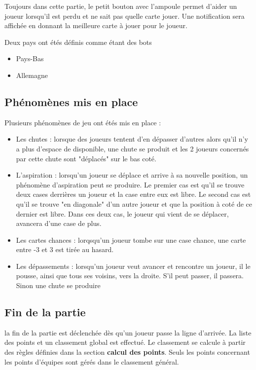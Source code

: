\documentclass[a4paper, 11pt]{article}
\begin{document}
Toujours dans cette partie, le petit bouton avec l'ampoule permet d'aider un joueur lorsqu'il est perdu et ne sait pas quelle carte jouer.
Une notification sera affichée en donnant la meilleure carte à jouer pour le joueur.
\bigskip

Deux pays ont étés définis comme étant des bots
\begin{itemize}
	\item Pays-Bas
	\item Allemagne
\end{itemize}

\subsection{Phénomènes mis en place}
Plusieurs phénomènes de jeu ont étés mis en place :
\begin{itemize}
	\item Les chutes : lorsque des joueurs tentent d'en dépasser d'autres alors qu'il n'y a plus d'espace de disponible, une chute se produit et les 2 joueurs concernés par cette chute sont "déplacés" sur le bas coté.
	\item L'aspiration : lorsqu'un joueur se déplace et arrive à sa nouvelle position, un phénomène d'aspiration peut se produire. Le premier cas est qu'il se trouve deux cases derrières un joueur et la case entre eux est libre. Le second cas est qu'il se trouve "en diagonale" d'un autre joueur et que la position à coté de ce dernier est libre. Dans ces deux cas, le joueur qui vient de se déplacer, avancera d'une case de plus.
	\item Les cartes chances : lorqsqu'un joueur tombe sur une case chance, une carte entre -3 et 3 est tirée au hasard.
	\item Les dépassements : lorsqu'un joueur veut avancer et rencontre un joueur, il le pousse, ainsi que tous ses voisins, vers la droite. S'il peut passer, il passera. Sinon une chute se produire
\end{itemize}

\subsection{Fin de la partie}
la fin de la partie est déclenchée dès qu'un joueur passe la ligne d'arrivée. La liste des points et un classement global est effectué.
\bigskip
Le classement se calcule à partir des règles définies dans la section \textbf{calcul des points}. Seuls les points concernant les points d'équipes sont gérés dans le classement général.
\end{document}
